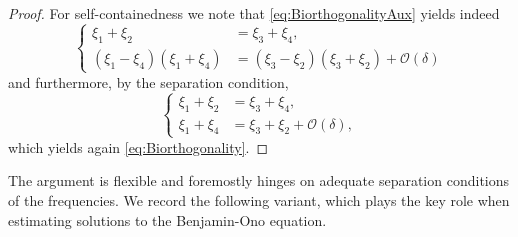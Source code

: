 \documentclass{amsart}
\theoremstyle{definition}
\begin{document}
\begin{proof}
For self-containedness we note that \eqref{eq:BiorthogonalityAux} yields indeed
\begin{equation*}
\left\{ \begin{array}{cl}
\xi_1 + \xi_2 &= \xi_3 + \xi_4, \\
(\xi_1- \xi_4)(\xi_1+\xi_4)  &=  (\xi_3-\xi_2)(\xi_3+\xi_2) + \mathcal{O}(\delta)
\end{array} \right.
\end{equation*}
and furthermore, by the separation condition,
\begin{equation*}
\left\{ \begin{array}{cl}
\xi_1 + \xi_2 &= \xi_3 + \xi_4, \\
\xi_1+\xi_4  &=  \xi_3+\xi_2 + \mathcal{O}(\delta),
\end{array} \right.
\end{equation*}
which yields again \eqref{eq:Biorthogonality}.
\end{proof}

The argument is flexible and foremostly hinges on adequate separation conditions of the frequencies. We record the following variant, which plays the key role when estimating solutions to the Benjamin-Ono equation.
\end{document}
